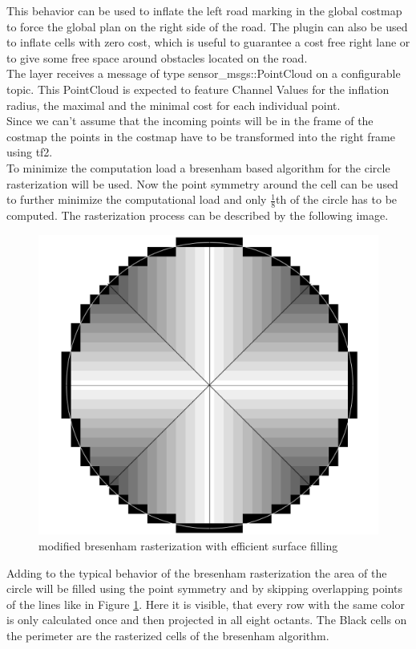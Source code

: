 This behavior can be used to inflate the left road marking in the global costmap to force the global plan on the right side of the road. The plugin can also be used to inflate cells with zero cost, which is useful to guarantee a cost free right lane or to give some free space around obstacles located on the road.\\

The layer receives a message of type sensor\_msgs::PointCloud on a configurable topic. This PointCloud is expected to feature Channel Values for the inflation radius, the maximal and the minimal cost for each individual point.\\

Since we can't assume that the incoming points will be in the frame of the costmap the points in the costmap have to be transformed into the right frame using tf2.\\

To minimize the computation load a bresenham based algorithm for the circle rasterization will be used.\cite{ComputerGraphics} Now the point symmetry around the cell can be used to further minimize the computational load and only $\frac{1}{8}$th of the circle has to be computed. The rasterization process can be described by the following image.\\

\begin{figure}
	\centering
	\includegraphics[width=.5\textwidth]{Pictures/rasterization}
	\caption{modified bresenham rasterization with efficient surface filling}
	\label{rasterization}
\end{figure}


Adding to the typical behavior of the bresenham rasterization the area of the circle will be filled using the point symmetry and by skipping overlapping points of the lines like in Figure \ref{rasterization}. Here it is visible, that every row with the same color is only calculated once and then projected in all eight octants. The Black cells on the perimeter are the rasterized cells of the bresenham algorithm.

